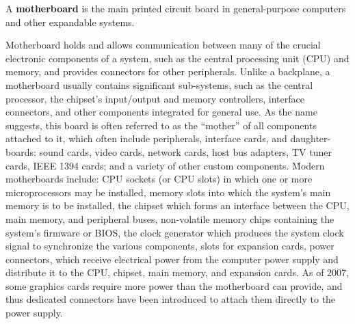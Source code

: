 \bd[Motherboard]
A \textbf{motherboard} is the main printed circuit board in general-purpose computers and other expandable systems.
\ed

Motherboard holds and allows communication between many of the crucial electronic components of a system, such as the
central processing unit (CPU) and memory, and provides connectors for other peripherals. Unlike a backplane, a
motherboard usually contains significant sub-systems, such as the central processor, the chipset's input/output and
memory controllers, interface connectors, and other components integrated for general use. As the name suggests, this
board is often referred to as the ``mother'' of all components attached to it, which often include peripherals,
interface cards, and daughter-boards: sound cards, video cards, network cards, host bus adapters, TV tuner cards,
IEEE 1394 cards; and a variety of other custom components. \v

Modern motherboards include: CPU sockets (or CPU slots) in which one or more microprocessors may be installed, memory
slots into which the system's main memory is to be installed, the chipset which forms an interface between the CPU,
main memory, and peripheral buses, non-volatile memory chips containing the system's firmware or BIOS, the clock
generator which produces the system clock signal to synchronize the various components, slots for expansion cards,
power connectors, which receive electrical power from the computer power supply and distribute it to the CPU,
chipset, main memory, and expansion cards. As of 2007, some graphics cards require more power than the motherboard
can provide, and thus dedicated connectors have been introduced to attach them directly to the power supply.

